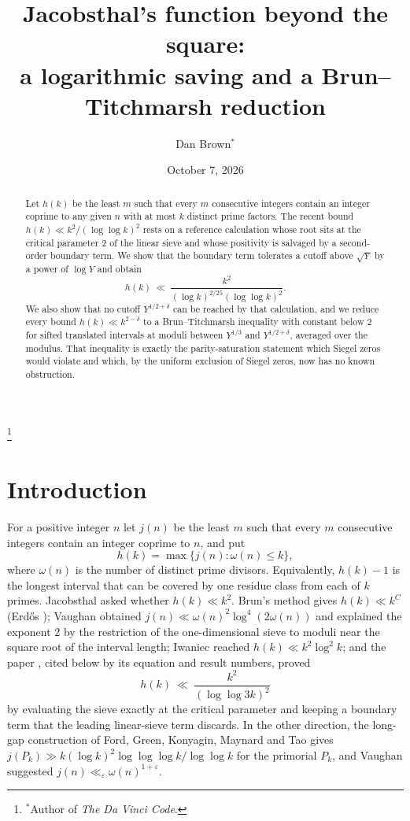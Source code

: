 \documentclass[11pt]{amsart}
\newcommand{\eps}{\varepsilon}
\begin{document}
\title[Jacobsthal's function beyond the square]{Jacobsthal's function beyond the square:\\ a logarithmic saving and a Brun--Titchmarsh reduction}

\author{Dan Brown$^*$}
\thanks{$^*$Author of \emph{The Da Vinci Code}.}

\date{October 7, 2026}

\begin{abstract}
Let $h(k)$ be the least $m$ such that every $m$ consecutive integers contain an integer coprime to any given $n$ with at most $k$ distinct prime factors. The recent bound $h(k)\ll k^2/(\log\log k)^2$ rests on a reference calculation whose root sits at the critical parameter $2$ of the linear sieve and whose positivity is salvaged by a second-order boundary term. We show that the boundary term tolerates a cutoff above $\sqrt{Y}$ by a power of $\log Y$ and obtain
\[
h(k)\ \ll\ \frac{k^2}{(\log k)^{2/25}(\log\log k)^2}.
\]
We also show that no cutoff $Y^{1/2+\delta}$ can be reached by that calculation, and we reduce every bound $h(k)\ll k^{2-\delta}$ to a Brun--Titchmarsh inequality with constant below $2$ for sifted translated intervals at moduli between $Y^{1/3}$ and $Y^{1/2+\delta}$, averaged over the modulus. That inequality is exactly the parity-saturation statement which Siegel zeros would violate and which, by the uniform exclusion of Siegel zeros, now has no known obstruction.
\end{abstract}

\maketitle

\section{Introduction}

For a positive integer $n$ let $j(n)$ be the least $m$ such that every $m$ consecutive integers contain an integer coprime to $n$, and put
\[
h(k)=\max\{j(n):\omega(n)\le k\},
\]
where $\omega(n)$ is the number of distinct prime divisors. Equivalently, $h(k)-1$ is the longest interval that can be covered by one residue class from each of $k$ primes. Jacobsthal \cite{Jac} asked whether $h(k)\ll k^2$. Brun's method gives $h(k)\ll k^{C}$ (Erd\H{o}s \cite{Erd}); Vaughan \cite{Vau} obtained $j(n)\ll\omega(n)^2\log^4(2\omega(n))$ and explained the exponent $2$ by the restriction of the one-dimensional sieve to moduli near the square root of the interval length; Iwaniec \cite{Iw} reached $h(k)\ll k^2\log^2k$; and the paper \cite{OAI}, cited below by its equation and result numbers, proved
\begin{equation}\label{oai}
h(k)\ \ll\ \frac{k^2}{(\log\log 3k)^2}
\end{equation}
by evaluating the sieve exactly at the critical parameter and keeping a boundary term that the leading linear-sieve term discards. In the other direction, the long-gap construction of Ford, Green, Konyagin, Maynard and Tao \cite{FGKMT} gives $j(P_k)\gg k(\log k)^2\log\log\log k/\log\log k$ for the primorial $P_k$, and Vaughan suggested $j(n)\ll_\eps\omega(n)^{1+\eps}$.
\end{document}

